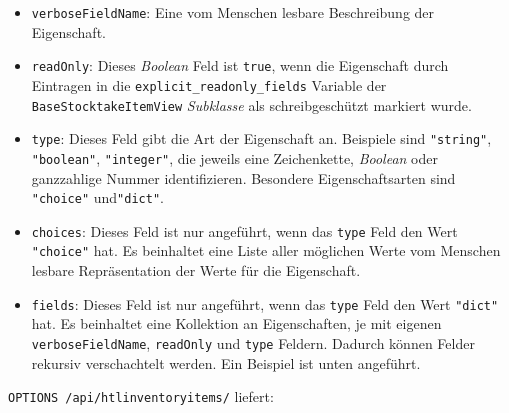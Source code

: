 \begin{itemize}
\tightlist
\item
  \texttt{verboseFieldName}: Eine vom Menschen lesbare Beschreibung der
  Eigenschaft.
\item
  \texttt{readOnly}: Dieses
  \emph{Boolean}
  Feld ist \texttt{true}, wenn die Eigenschaft durch Eintragen in die
  \texttt{explicit\_readonly\_fields} Variable der
  \texttt{BaseStocktakeItemView}
  \emph{Subklasse}
  als schreibgeschützt markiert wurde.
\item
  \texttt{type}: Dieses Feld gibt die Art der Eigenschaft an. Beispiele
  sind \texttt{"string"}, \texttt{"boolean"}, \texttt{"integer"}, die
  jeweils eine Zeichenkette,
  \emph{Boolean}
  oder ganzzahlige Nummer identifizieren. Besondere Eigenschaftsarten
  sind \texttt{"choice"} und\texttt{"dict"}.
\item
  \texttt{choices}: Dieses Feld ist nur angeführt, wenn das
  \texttt{type} Feld den Wert \texttt{"choice"} hat. Es beinhaltet eine
  Liste aller möglichen Werte \inkl{} vom Menschen lesbare
  Repräsentation der Werte für die Eigenschaft.
\item
  \texttt{fields}: Dieses Feld ist nur angeführt, wenn das \texttt{type}
  Feld den Wert \texttt{"dict"} hat. Es beinhaltet eine Kollektion an
  Eigenschaften, je mit eigenen \texttt{verboseFieldName},
  \texttt{readOnly} und \texttt{type} Feldern. Dadurch können Felder
  rekursiv verschachtelt werden. Ein Beispiel ist unten angeführt.
\end{itemize}

\texttt{OPTIONS\ /api/htlinventoryitems/} liefert:

